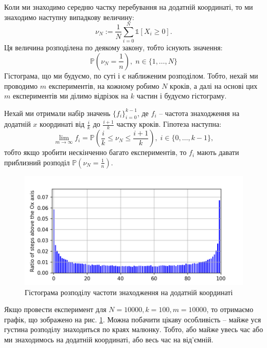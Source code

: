 \documentclass[14pt]{extarticle}
\begin{document}
Коли ми знаходимо середню частку перебування на додатній координаті, то ми знаходимо наступну випадкову величину:
\begin{equation}
    \nu_N := \frac{1}{N}\sum_{i=0}^N \mathds{1}[X_i \geq 0].
\end{equation}
Ця величина розподілена по деякому закону, тобто існують значення:
\begin{equation}
    \mathbb{P}\left(\nu_N = \frac{1}{n}\right), \; n \in \{1,\dots,N\}
\end{equation}
Гістограма, що ми будуємо, по суті і є наближеним розподілом. Тобто, нехай ми проводимо $m$ експериментів, на кожному робимо $N$ кроків, а далі на основі цих $m$ експериментів ми ділимо відрізок на $k$ частин і будуємо гістограму. 

Нехай ми отримали набір значень $\{f_i\}_{i=0}^{k-1}$, де $f_i$ -- частота знаходження на додатній $x$ координаті від $\frac{i}{k}$ до $\frac{i+1}{k}$ частку кроків. Гіпотеза наступна: 
\begin{equation}
    \lim_{m \to \infty} f_i = \mathbb{P}\left(\frac{i}{k} \leq \nu_N \leq \frac{i+1}{k}\right), \; i \in \{0,\dots,k-1\},
\end{equation}
тобто якщо  зробити нескінченно багато експериментів, то $f_i$ мають давати приблизний розподіл $\mathbb{P}\left(\nu_N = \frac{1}{n}\right)$.

\begin{figure}
    \centering
    \includegraphics[width=\textwidth]{images/hw_2/positive_y_experiment.png}
    \caption{Гістограма розподілу частоти знаходження на додатній координаті}
    \label{fig:histogram_1}
\end{figure}

Якщо провести експеримент для $N=10000,k=100,m=10000$, то отримаємо графік, що зображено на рис. \ref{fig:histogram_1}. Можна побачити цікаву особливість -- майже уся густина розподілу знаходиться по краях малюнку. Тобто, або майже увесь час або ми знаходимось на додатній координаті, або весь час на від'ємній.
\end{document}
